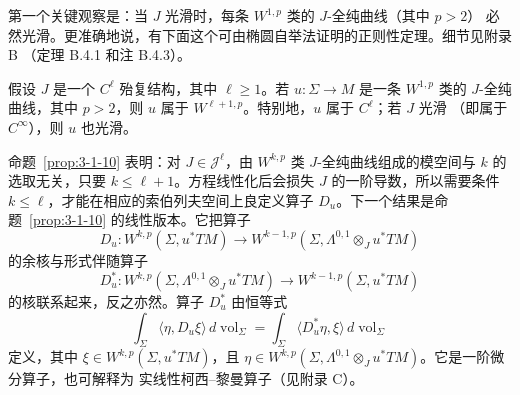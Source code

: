 第一个关键观察是：当 $J$ 光滑时，每条 $W^{1,p}$ 类的 $J$-全纯曲线（其中 $p>2$）
必然光滑。更准确地说，有下面这个可由椭圆自举法证明的正则性定理。细节见附录 B
（定理 B.4.1 和注 B.4.3）。

\begin{proposition}\label{prop:3-1-10}
假设 $J$ 是一个 $C^\ell$ 殆复结构，其中 $\ell\ge1$。若
$u:\Sigma\to M$ 是一条 $W^{1,p}$ 类的 $J$-全纯曲线，其中 $p>2$，则
$u$ 属于 $W^{\ell+1,p}$。特别地，$u$ 属于 $C^\ell$；若 $J$ 光滑
（即属于 $C^\infty$），则 $u$ 也光滑。
\end{proposition}

命题~\ref{prop:3-1-10} 表明：对 $J\in\mathcal J^\ell$，由 $W^{k,p}$ 类
$J$-全纯曲线组成的模空间与 $k$ 的选取无关，只要 $k\le\ell+1$。方程线性化后会损失
$J$ 的一阶导数，所以需要条件 $k\le\ell$，才能在相应的索伯列夫空间上良定义算子
$D_u$。下一个结果是命题~\ref{prop:3-1-10} 的线性版本。它把算子
\begin{equation}\label{eq:3-1-8}
  D_u:W^{k,p}(\Sigma,u^*TM)
  \longrightarrow
  W^{k-1,p}(\Sigma,\Lambda^{0,1}\otimes_Ju^*TM)
\end{equation}
的余核与形式伴随算子
\begin{equation}\label{eq:3-1-9}
  D_u^*:W^{k,p}(\Sigma,\Lambda^{0,1}\otimes_Ju^*TM)
  \longrightarrow
  W^{k-1,p}(\Sigma,u^*TM)
\end{equation}
的核联系起来，反之亦然。算子 $D_u^*$ 由恒等式
\[
  \int_\Sigma\langle\eta,D_u\xi\rangle\,d\operatorname{vol}_\Sigma
  =
  \int_\Sigma\langle D_u^*\eta,\xi\rangle\,d\operatorname{vol}_\Sigma
\]
定义，其中 $\xi\in W^{k,p}(\Sigma,u^*TM)$，且
$\eta\in W^{k,p}(\Sigma,\Lambda^{0,1}\otimes_Ju^*TM)$。它是一阶微分算子，也可解释为
实线性柯西--黎曼算子（见附录 C）。

